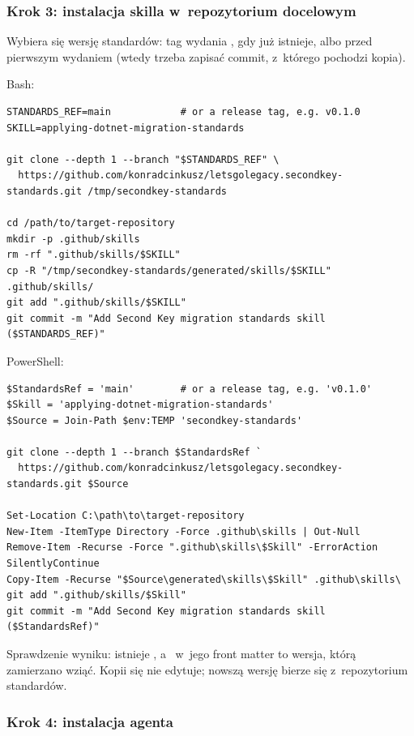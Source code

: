 \subsubsection{Krok 3: instalacja skilla w~repozytorium docelowym}

Wybiera się wersję standardów: tag wydania , gdy już istnieje, albo
 przed pierwszym wydaniem (wtedy trzeba zapisać commit, z~którego pochodzi
kopia).

Bash:

\begin{lstlisting}
STANDARDS_REF=main            # or a release tag, e.g. v0.1.0
SKILL=applying-dotnet-migration-standards

git clone --depth 1 --branch "$STANDARDS_REF" \
  https://github.com/konradcinkusz/letsgolegacy.secondkey-standards.git /tmp/secondkey-standards

cd /path/to/target-repository
mkdir -p .github/skills
rm -rf ".github/skills/$SKILL"
cp -R "/tmp/secondkey-standards/generated/skills/$SKILL" .github/skills/
git add ".github/skills/$SKILL"
git commit -m "Add Second Key migration standards skill ($STANDARDS_REF)"
\end{lstlisting}

PowerShell:

\begin{lstlisting}
$StandardsRef = 'main'        # or a release tag, e.g. 'v0.1.0'
$Skill = 'applying-dotnet-migration-standards'
$Source = Join-Path $env:TEMP 'secondkey-standards'

git clone --depth 1 --branch $StandardsRef `
  https://github.com/konradcinkusz/letsgolegacy.secondkey-standards.git $Source

Set-Location C:\path\to\target-repository
New-Item -ItemType Directory -Force .github\skills | Out-Null
Remove-Item -Recurse -Force ".github\skills\$Skill" -ErrorAction SilentlyContinue
Copy-Item -Recurse "$Source\generated\skills\$Skill" .github\skills\
git add ".github/skills/$Skill"
git commit -m "Add Second Key migration standards skill ($StandardsRef)"
\end{lstlisting}

Sprawdzenie wyniku: istnieje
, a~
w~jego front matter to wersja, którą zamierzano wziąć. Kopii się nie edytuje; nowszą wersję
bierze się z~repozytorium standardów.

\subsubsection{Krok 4: instalacja agenta}

